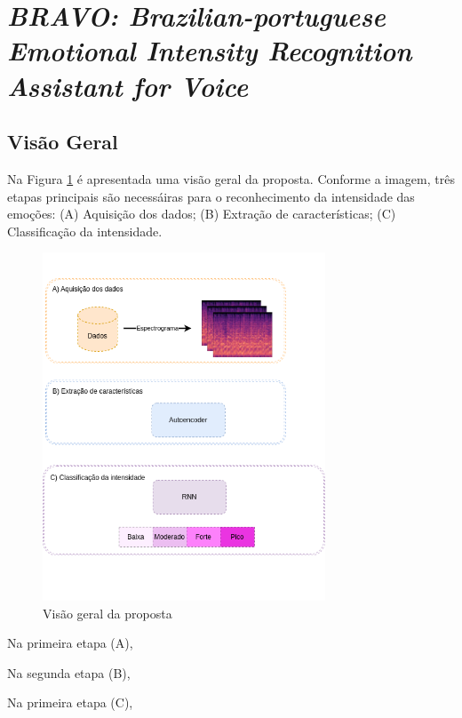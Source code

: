 \section{\textit{BRAVO: Brazilian-portuguese Emotional Intensity Recognition Assistant for Voice}}

\subsection{Visão Geral}

Na Figura \ref{fig:visaogeralproposta} é apresentada uma visão geral da proposta. Conforme a imagem, três etapas principais são necessáiras para o reconhecimento da intensidade das emoções: (A) Aquisição dos dados;
(B) Extração de características; (C) Classificação da intensidade.

\begin{figure}[!h]
\centering
\includegraphics[width=0.750\textwidth]{imagens/arquitetura-visao-geral.png}
\caption{\label{fig:visaogeralproposta}Visão geral da proposta}
\end{figure}

Na primeira etapa (A), 

Na segunda etapa (B), 

Na primeira etapa (C), 

\clearpage

